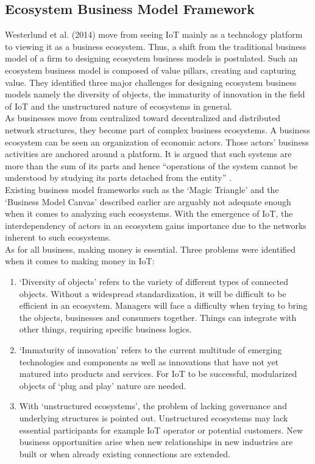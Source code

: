 	\subsection{Ecosystem Business Model Framework}
	\vspace{-1em}
		Westerlund et al. (2014) \cite{westerlund} move from seeing IoT mainly as a technology platform to viewing it as a business ecosystem. Thus, a shift from the traditional business model of a firm to designing ecosystem business models is postulated. Such an ecosystem business model is composed of value pillars, creating and capturing value. They identified three major challenges for designing ecosystem business models namely the diversity of objects, the immaturity of innovation in the field of IoT and the unstructured nature of ecosystems in general.\\
		As businesses move from centralized toward decentralized and distributed network structures, they become part of complex business ecosystems. A business ecosystem can be seen an organization of economic actors. Those actors' business activities are anchored around a platform. It is argued that such systems are more than the sum of its parts and hence ``operations of the system cannot be understood by studying its parts detached from the entity'' \cite{westerlund}.\\
		Existing business model frameworks such as the `Magic Triangle' and the `Business Model Canvas' described earlier are arguably not adequate enough when it comes to analyzing such ecosystems. With the emergence of IoT, the interdependency of actors in an ecosystem gains importance due to the networks inherent to such ecosystems.\\
		As for all business, making money is essential. Three problems were identified when it comes to making money in IoT:\\
		\vspace{-1em}
		\begin{enumerate}
			\item `Diversity of objects' refers to the variety of different types of connected objects. Without a widespread standardization, it will be difficult to be efficient in an ecosystem. Managers will face a difficulty when trying to bring the objects, businesses and consumers together. Things can integrate with other things, requiring specific business logics.

			\item `Immaturity of innovation' refers to the current multitude of emerging technologies and components as well as innovations that have not yet matured into products and services. For IoT to be successful, modularized objects of `plug and play' nature are needed.

			\item With `unstructured ecosystems', the problem of lacking governance and underlying structures is pointed out. Unstructured ecosystems may lack essential participants for example IoT operator or potential customers. New business opportunities arise when new relationships in new industries are built or when already existing connections are extended.
		\end{enumerate}
